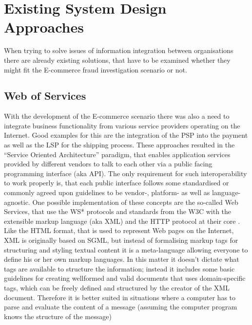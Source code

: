 
\section{Existing System Design Approaches}
\label{sec:system_approaches}

When trying to solve issues of information integration between organisations there are already existing solutions, that have to be examined whether they might fit the E-commerce fraud investigation scenario or not.

\subsection{Web of Services}
\label{subsec:web_services}

With the development of the E-commerce scenario there was also a need to integrate business functionality from various service providers operating on the Internet. Good examples for this are the integration of the \gls{PSP} into the payment as well as the \gls{LSP} for the shipping process. These approaches resulted in the ``Service Oriented Architecture'' paradigm, that enables application services provided by different vendors to talk to each other via a public facing programming interface (aka \gls{API}). The only requirement for such interoperability to work properly is, that each public interface follows some standardised or commonly agreed upon guidelines to be vendor-, platform- as well as language-agnostic. One possible implementation of these concepts are the so-called Web Services, that use the WS* protocols and standards from the \gls{W3C} with the extensible markup language (aka \gls{XML}) and the \gls{HTTP} protocol at their core \citep{josuttis2007soa}. \\

Like the \gls{HTML} format, that is used to represent Web pages on the Internet, \gls{XML} is originally based on \gls{SGML}, but instead of formalising markup tags for structuring and styling textual content it is a meta-language allowing everyone to define his or her own markup languages. In this matter it doesn’t dictate what tags are available to structure the information; instead it includes some basic guidelines for creating wellformed and valid documents that uses domain-specific tags, which can be freely defined and structured by the creator of the XML document. Therefore it is better suited in situations where a computer has to parse and evaluate the content of a message (assuming the computer program knows the structure of the message) \\

